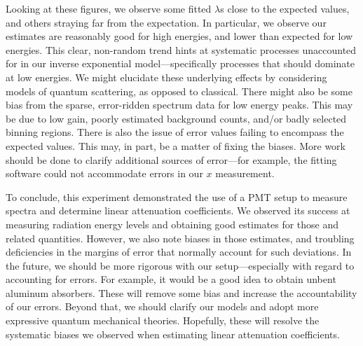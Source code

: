 \documentclass[12pt, letterpaper]{article}
\begin{document}
Looking at these figures, we observe some fitted $\lambda$s close to the expected values, and others straying far from the expectation. In particular, we observe our estimates are reasonably good for high energies, and lower than expected for low energies. This clear, non-random trend hints at systematic processes unaccounted for in our inverse exponential model—specifically processes that should dominate at low energies. We might elucidate these underlying effects by considering models of quantum scattering, as opposed to classical. There might also be some bias from the sparse, error-ridden spectrum data for low energy peaks. This may be due to low gain, poorly estimated background counts, and/or badly selected binning regions. There is also the issue of error values failing to encompass the expected values. This may, in part, be a matter of fixing the biases. More work should be done to clarify additional sources of error—for example, the fitting software could not accommodate errors in our $x$ measurement. 

To conclude, this experiment demonstrated the use of a PMT setup to measure spectra and determine linear attenuation coefficients. We observed its success at measuring radiation energy levels and obtaining good estimates for those and related quantities. However, we also note biases in those estimates, and troubling deficiencies in the margins of error that normally account for such deviations. In the future, we should be more rigorous with our setup—especially with regard to accounting for errors. For example, it would be a good idea to obtain unbent aluminum absorbers. These will remove some bias and increase the accountability of our errors. Beyond that, we should clarify our models and adopt more expressive quantum mechanical theories. Hopefully, these will resolve the systematic biases we observed when estimating linear attenuation coefficients. 
\end{document}
